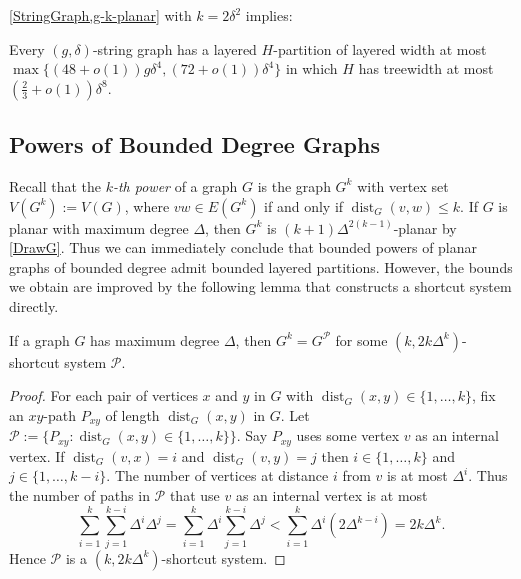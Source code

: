 \documentclass{patmorin}
\newcommand{\note}[2]{{\color{red}[#1:~#2]}}
\DeclareMathOperator{\dist}{dist}
\newcommand{\PP}{\mathcal{P}}
\renewcommand{\geq}{\geqslant}
\renewcommand{\leq}{\leqslant}
\begin{document}
\cref{StringGraph,g-k-planar} with $k=2\delta^2$ implies:


\begin{prop}
Every $(g,\delta)$-string graph has a layered $H$-partition of layered width at most 
$\max\{(48+o(1))g\delta^4, (72+o(1))\delta^4\}$ in which $H$ has treewidth at most $(\frac{2}{3}+o(1)) \delta^8$.
\end{prop}




\subsection{Powers of Bounded Degree Graphs}

Recall that the \emph{$k$-th power} of a graph $G$ is the graph $G^k$ with vertex set $V(G^k):=V(G)$, where $vw\in E(G^k)$ if and only if $\dist_G(v,w)\leq k$. If $G$ is planar with maximum degree $\Delta$, then $G^k$ is $(k+1)\Delta^{2(k-1)} $-planar by \cref{DrawG}. Thus we can immediately conclude that bounded powers of planar graphs of bounded degree admit bounded layered partitions. However, the bounds we obtain are improved by the following lemma that constructs a shortcut system directly. 

\begin{lem}
\label{PowerShortcut}
If a graph $G$ has maximum degree $\Delta$, then $G^k = G^\PP$ for some $(k,2k \Delta^{k})$-shortcut system $\PP$.
\end{lem}

\begin{proof}
For each pair of vertices $x$ and $y$ in $G$ with $\dist_G(x,y)\in\{1,\dots,k\}$, fix an $xy$-path $P_{xy}$ of length 
$\dist_G(x,y)$  in $G$. Let $\PP:=\{P_{xy}: \dist_G(x,y)\in\{1,\dots,k\} \}$. Say $P_{xy}$ uses some vertex $v$ as an internal vertex. If $\dist_G(v,x)=i$ and $\dist_G(v,y)=j$ then $i\in\{1,\dots,k\}$ and $j\in\{1,\dots,k-i\}$. The number of vertices at distance $i$ from $v$ is at most $\Delta^i$. Thus the number of paths in $\PP$ that use $v$ as an internal vertex is at most 
$$\sum_{i=1}^k \sum_{j=1}^{k-i} \Delta^i\Delta^j 
= \sum_{i=1}^k \Delta^i \sum_{j=1}^{k-i} \Delta^j 
< \sum_{i=1}^k \Delta^i ( 2 \Delta^{k-i} )
= 2k \Delta^k.$$
Hence $\PP$ is a $(k, 2k \Delta^k)$-shortcut system. 
\end{proof}
\end{document}
